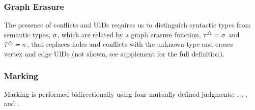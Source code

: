 \subsubsection{Graph Erasure} The presence of conflicts and UIDs requires us to distinguish syntactic types from semantic types, $\sigma$, which are related by a graph erasure function, $\tau\mathclose{}^{\triangle}\mathclose{} = \sigma$ and $\bar{\tau}\mathclose{}^{\triangle}\mathclose{} = \sigma$, that replaces holes and conflicts with the unknown type and erases vertex and edge UIDs (not shown, see supplement for the full definition).

\subsubsection{Marking}
\label{sub:marking}
Marking is performed bidirectionally using four mutually defined judgments:
\synMarkConstraint{\ctx}{\EMV}{\ECMV}{\STMV},
\synMarkConstraint{\ctx}{\ELV}{\ELMV}{\STMV},
\anaMarkConstraint{\ctx}{\EMV}{\ECMV}{\STMV}, and
\synMarkConstraint{\ctx}{\ELV}{\ELMV}{\STMV}.



